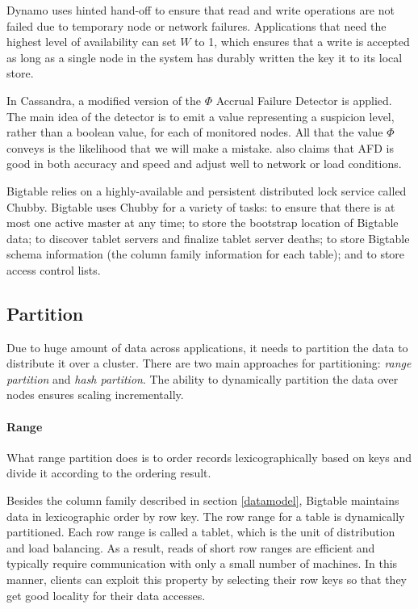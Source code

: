 \documentclass[12pt,letter]{article}
\begin{document}
Dynamo uses hinted hand-off to ensure that read and write operations are not failed due to temporary node or network failures. Applications that need the highest level of availability can set $W$ to 1, which ensures that a write is accepted as long as a single node in the system has durably written the key it to its local store. 

In Cassandra, a modified version of the $\Phi$ Accrual Failure Detector is applied. The main idea of the detector is to emit a value representing a suspicion level, rather than a boolean value, for each of monitored nodes. All that the value $\Phi$ conveys is the likelihood that we will make a mistake. \citep{LakshamAvinash2010} also claims that AFD is good in both accuracy and speed and adjust well to network or load conditions.

Bigtable relies on a highly-available and persistent distributed lock service called Chubby. Bigtable uses Chubby for a variety of tasks: to ensure that there is at most one active master at any time; to store the bootstrap location of Bigtable data; to discover tablet servers and finalize tablet server deaths; to store Bigtable schema information (the column family information for each table); and to store access control lists.

\subsection{Partition}
Due to huge amount of data across applications, it needs to partition the data to distribute it over a cluster. There are two main approaches for partitioning: \textit{range partition} and \textit{hash partition}. The ability to dynamically partition the data over nodes ensures scaling incrementally. 

\paragraph*{Range}
What range partition does is to order records lexicographically based on keys and divide it according to the ordering result.

Besides the column family described in section \ref{datamodel}, Bigtable maintains data in lexicographic order by row key. The row range for a table is dynamically partitioned. Each row range is called a tablet, which is the unit of distribution and load balancing. As a result, reads of short row ranges are efficient and typically require communication with only a small number of machines. In this manner, clients can exploit this property by selecting their row keys so that they get good locality for their data accesses.
\end{document}

